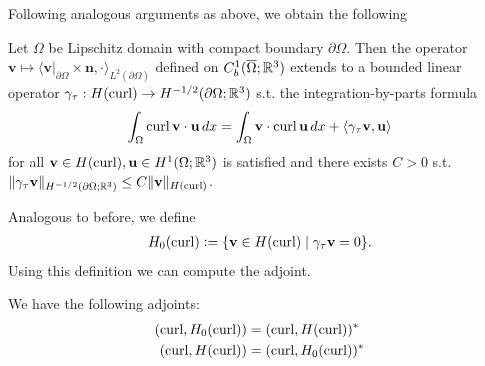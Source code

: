 \documentclass[../master_thesis.tex]{subfiles}
\begin{document}
Following analogous arguments as above, we obtain the following 
\begin{theorem}\label{thm:trace_hcurl}
    Let $\Omega$ be Lipschitz domain with compact boundary $\partial \Omega$.
    Then the operator $\mathbf{v} \mapsto 
    \langle \mathbf{v}|_{\partial \Omega} \times \mathbf{n}, \cdot \rangle_{L^2(\partial \Omega)}$ 
    defined on $C^1_b(\overline{\Omega};\mathbb{R}^3)$ extends to a bounded linear operator 
    $\gamma_\tau: H(\operatorname{curl}) \rightarrow H^{-1/2}(\partial \Omega; \mathbb{R}^3)$ 
    s.t. the integration-by-parts formula 
    \begin{align*}
        \int_\Omega \operatorname{curl} \mathbf{v} \cdot \mathbf{u} \, dx = 
            \int_\Omega \mathbf{v} \cdot \operatorname{curl} \mathbf{u} \, dx
            + \langle \gamma_\tau \mathbf{v}, \mathbf{u} \rangle
    \end{align*}
    for all $\mathbf{v} \in H(\operatorname{curl}), \mathbf{u} \in H^1(\Omega;\mathbb{R}^3)$
    is satisfied and there exists $C>0$ s.t.
    $\lVert \gamma_\tau \mathbf{v} \rVert _{H^{-1/2}(\partial \Omega; \mathbb{R}^3)} 
    \leq C \lVert \mathbf{v} \rVert _{H(\operatorname{curl})}$. 
\end{theorem}
Analogous to before, we define 
\begin{align*}
    H_0(\operatorname{curl}) \vcentcolon= \{ \mathbf{v} \in H(\operatorname{curl}) \mid \gamma_\tau \mathbf{v} = 0\}.
\end{align*}
Using this definition we can compute the adjoint.
\begin{theorem}
    We have the following adjoints:
    \begin{align*}
        (\operatorname{curl}, H_0(\operatorname{curl})) &= (\operatorname{curl}, H(\operatorname{curl}))^* 
        \\ (\operatorname{curl}, H(\operatorname{curl})) &= (\operatorname{curl}, H_0(\operatorname{curl}))^* 
    \end{align*}
\end{theorem}
\end{document}
